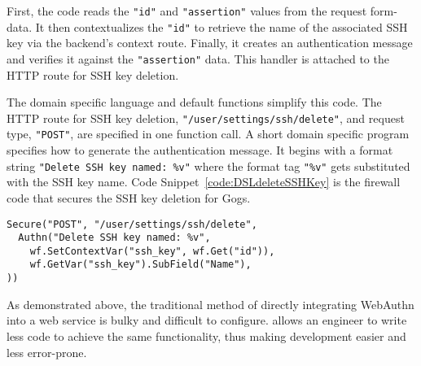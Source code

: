 First, the code reads the \lstinline{"id"} and \lstinline{"assertion"} values from the request form-data. It then contextualizes the \lstinline{"id"} to retrieve the name of the associated SSH key via the backend's context route. Finally, it creates an authentication message and verifies it against the \lstinline{"assertion"} data. This handler is attached to the HTTP route for SSH key deletion.

The domain specific language and default functions simplify this code. The HTTP route for SSH key deletion, \lstinline{"/user/settings/ssh/delete"}, and request type, \lstinline{"POST"}, are specified in one function call. A short domain specific program specifies how to generate the authentication message. It begins with a format string \lstinline{"Delete SSH key named: %v"} where the format tag \lstinline{"%v"} gets substituted with the SSH key name. Code Snippet~\ref{code:DSLdeleteSSHKey} is the firewall code that secures the SSH key deletion for Gogs.




\begin{lstlisting}[float=h,label=code:DSLdeleteSSHKey,caption=Gogs firewall code which incorporates the domain specific language to secures the delete SSH key operation.]
Secure("POST", "/user/settings/ssh/delete", 
  Authn("Delete SSH key named: %v",
    wf.SetContextVar("ssh_key", wf.Get("id")),
    wf.GetVar("ssh_key").SubField("Name"),
))
\end{lstlisting}

As demonstrated above, the traditional method of directly integrating WebAuthn into a web service is bulky and difficult to configure. \sys{} allows an engineer to write less code to achieve the same functionality, thus making development easier and less error-prone.




